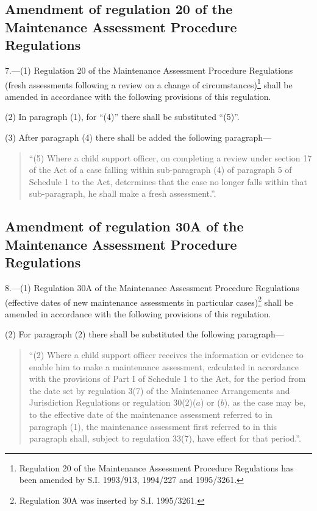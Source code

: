 \documentclass[a4paper]{article}
\begin{document}
\subsection[7. Amendment of regulation 20 of the Maintenance Assessment Procedure Regulations]{Amendment of regulation 20 of the Maintenance Assessment Procedure Regulations}

7.—(1) Regulation 20 of the Maintenance Assessment Procedure Regulations (fresh assessments following a review on a change of circumstances)\footnote{\frenchspacing Regulation 20 of the Maintenance Assessment Procedure Regulations has been amended by S.I. 1993/913, 1994/227 and 1995/3261.} shall be amended in accordance with the following provisions of this regulation.

(2) In paragraph (1), for “(4)” there shall be substituted “(5)”.

(3) After paragraph (4) there shall be added the following paragraph—
\begin{quotation}
“(5) Where a child support officer, on completing a review under section 17 of the Act of a case falling within sub-paragraph (4) of paragraph 5 of Schedule 1 to the Act, determines that the case no longer falls within that sub-paragraph, he shall make a fresh assessment.”.
\end{quotation}

\subsection[8. Amendment of regulation 30A of the Maintenance Assessment Procedure Regulations]{Amendment of regulation 30A of the Maintenance Assessment Procedure Regulations}

8.—(1) Regulation 30A of the Maintenance Assessment Procedure Regulations (effective dates of new maintenance assessments in particular cases)\footnote{\frenchspacing Regulation 30A was inserted by S.I. 1995/3261.} shall be amended in accordance with the following provisions of this regulation.

(2) For paragraph (2) there shall be substituted the following paragraph—
\begin{quotation}
“(2) Where a child support officer receives the information or evidence to enable him to make a maintenance assessment, calculated in accordance with the provisions of Part I of Schedule 1 to the Act, for the period from the date set by regulation 3(7) of the Maintenance Arrangements and Jurisdiction Regulations or regulation 30(2)($a$) or ($b$), as the case may be, to the effective date of the maintenance assessment referred to in paragraph (1), the maintenance assessment first referred to in this paragraph shall, subject to regulation 33(7), have effect for that period.”.
\end{quotation}
\end{document}
